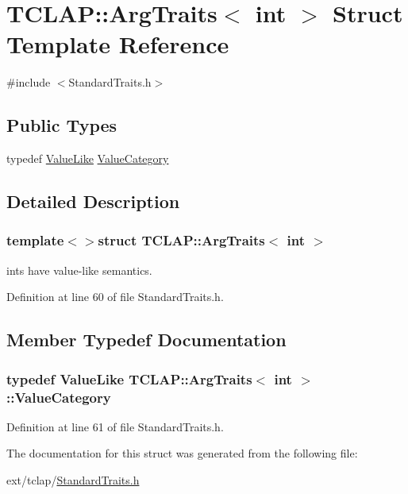 \hypertarget{struct_t_c_l_a_p_1_1_arg_traits_3_01int_01_4}{}\section{T\+C\+L\+A\+P\+:\+:Arg\+Traits$<$ int $>$ Struct Template Reference}
\label{struct_t_c_l_a_p_1_1_arg_traits_3_01int_01_4}


{\ttfamily \#include $<$Standard\+Traits.\+h$>$}

\subsection*{Public Types}
\begin{DoxyCompactItemize}
\item 
typedef \hyperlink{struct_t_c_l_a_p_1_1_value_like}{Value\+Like} \hyperlink{struct_t_c_l_a_p_1_1_arg_traits_3_01int_01_4_a8e577764b626e9e928d71567123d92a9}{Value\+Category}
\end{DoxyCompactItemize}


\subsection{Detailed Description}
\subsubsection*{template$<$$>$struct T\+C\+L\+A\+P\+::\+Arg\+Traits$<$ int $>$}

ints have value-\/like semantics. 

Definition at line 60 of file Standard\+Traits.\+h.



\subsection{Member Typedef Documentation}
\hypertarget{struct_t_c_l_a_p_1_1_arg_traits_3_01int_01_4_a8e577764b626e9e928d71567123d92a9}{}
\subsubsection[{Value\+Category}]{\setlength{\rightskip}{0pt plus 5cm}typedef {\bf Value\+Like} {\bf T\+C\+L\+A\+P\+::\+Arg\+Traits}$<$ int $>$\+::{\bf Value\+Category}}\label{struct_t_c_l_a_p_1_1_arg_traits_3_01int_01_4_a8e577764b626e9e928d71567123d92a9}


Definition at line 61 of file Standard\+Traits.\+h.



The documentation for this struct was generated from the following file\+:\begin{DoxyCompactItemize}
\item 
ext/tclap/\hyperlink{_standard_traits_8h}{Standard\+Traits.\+h}\end{DoxyCompactItemize}
